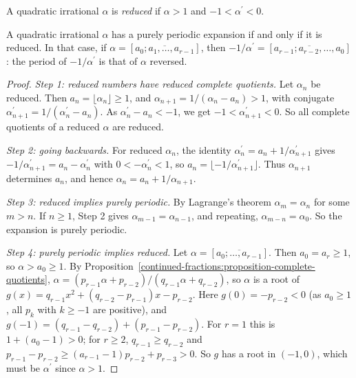 \begin{definition}\label{continued-fractions:definition-reduced}
A quadratic irrational $\alpha$ is \emph{reduced} if $\alpha > 1$ and $-1 < \alpha^{\prime} < 0$.
\end{definition}

\begin{theorem}[Galois]\label{continued-fractions:theorem-galois}
A quadratic irrational $\alpha$ has a purely periodic expansion if and only if it is reduced. In that case, if $\alpha = [\overline{a_0; a_1, \ldots, a_{r-1}}]$, then
$-1/\alpha^{\prime} = [\overline{a_{r-1}; a_{r-2}, \ldots, a_0}]$: the period of $-1/\alpha^{\prime}$ is that of $\alpha$ reversed.
\end{theorem}

\begin{proof}
\emph{Step 1: reduced numbers have reduced complete quotients.} Let $\alpha_n$ be reduced. Then $a_n = \lfloor\alpha_n\rfloor \geq 1$, and $\alpha_{n+1} = 1/(\alpha_n - a_n) > 1$, with conjugate
$\alpha_{n+1}^{\prime} = 1/(\alpha_n^{\prime} - a_n)$. As $\alpha_n^{\prime} - a_n < -1$, we get $-1 < \alpha_{n+1}^{\prime} < 0$. So all complete quotients of a reduced $\alpha$ are reduced.

\emph{Step 2: going backwards.} For reduced $\alpha_n$, the identity $\alpha_n^{\prime} = a_n + 1/\alpha_{n+1}^{\prime}$ gives $-1/\alpha_{n+1}^{\prime} = a_n - \alpha_n^{\prime}$ with
$0 < -\alpha_n^{\prime} < 1$, so $a_n = \lfloor -1/\alpha_{n+1}^{\prime} \rfloor$. Thus $\alpha_{n+1}$ determines $a_n$, and hence $\alpha_n = a_n + 1/\alpha_{n+1}$.

\emph{Step 3: reduced implies purely periodic.} By Lagrange's theorem $\alpha_m = \alpha_n$ for some $m > n$. If $n \geq 1$, Step 2 gives $\alpha_{m-1} = \alpha_{n-1}$, and repeating, $\alpha_{m-n} = \alpha_0$.
So the expansion is purely periodic.

\emph{Step 4: purely periodic implies reduced.} Let $\alpha = [\overline{a_0; \ldots, a_{r-1}}]$. Then $a_0 = a_r \geq 1$, so $\alpha > a_0 \geq 1$. By
Proposition~\ref{continued-fractions:proposition-complete-quotients}, $\alpha = (p_{r-1}\alpha + p_{r-2})/(q_{r-1}\alpha + q_{r-2})$, so $\alpha$ is a root of
$g(x) = q_{r-1}x^2 + (q_{r-2} - p_{r-1})x - p_{r-2}$. Here $g(0) = -p_{r-2} < 0$ (as $a_0 \geq 1$, all $p_k$ with $k \geq -1$ are positive), and
$g(-1) = (q_{r-1} - q_{r-2}) + (p_{r-1} - p_{r-2})$. For $r = 1$ this is $1 + (a_0 - 1) > 0$; for $r \geq 2$, $q_{r-1} \geq q_{r-2}$ and $p_{r-1} - p_{r-2} \geq (a_{r-1} - 1)p_{r-2} + p_{r-3} > 0$. So
$g$ has a root in $(-1, 0)$, which must be $\alpha^{\prime}$ since $\alpha > 1$.


\end{proof}
